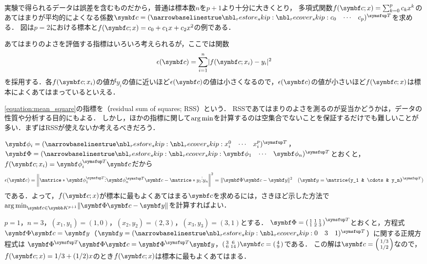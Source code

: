 \documentclass[../../main]{subfiles}
\begin{document}
実験で得られるデータは誤差を含むものだから，普通は標本数\(n\)を\(p+1\)より十分に大きくとり，
多項式関数\(f(\vect{c};x)=\sum_{k=0}^pc_kx^k\)のあてはまりが平均的によくなる係数\(\vect{c}=\trps{\rowvect{c_0 & \cdots & c_p}}\)を求める．
図は\(p=2\)における標本と\(f(\vect{c};x)=c_0+c_1x+c_2x^2\)の例である．

あてはまりのよさを評価する指標はいろいろ考えられるが，ここでは関数
\begin{equation}
  \label{equation:mean_square}
  \epsilon(\vect{c}) = \sum_{i=1}^n\abs{f(\vect{c};x_i)-y_i}^2
\end{equation}
を採用する．各\(f(\vect{c};x_i)\)の値が\(y_i\)の値に近いほど\(\epsilon(\vect{c})\)の値は小さくなるので，\(\epsilon(\vect{c})\)の値が小さいほど\(f(\vect{c};x)\)は標本によくあてはまっているといえる．

\begin{note}
  \cref{equation:mean_square}の指標を（residual sum of squares; RSS）という．
  RSSであてはまりのよさを測るのが妥当かどうかは，データの性質や分析する目的にもよる．
  しかし，ほかの指標に関して\(\operatorname*{arg\,min}\)を計算するのは\texttwoemdash 空集合でないことを保証するだけでも\texttwoemdash 難しいことが多い．まずはRSSが使えないか考えるべきだろう．
\end{note}

\(\vect{\phi}_i=\trps{\rowvect{x_i^0 & \cdots & x_i^p}}\)，\(\mat{\Phi}=\trps{\rowvect{\vect{\phi}_1 & \cdots & \vect{\phi}_n}}\)とおくと，\(f(\vect{c};x_i)=\trps{\vect{\phi}_i}\vect{c}\)だから
\[
  \epsilon(\vect{c}) = \vnorm*{\matrice*{\trps{\vect{\phi}_1} \\ \vdots \\ \trps{\vect{\phi}_n}}\vect{c}-\matrice*{y_1 \\ \vdots \\ y_n}}^2
  = \vnorm{\mat{\Phi}\vect{c}-\vect{y}}^2\quad(\vect{y}=\trps{\matrice{y_1 & \cdots & y_n}})
\]
である．よって，\(f(\vect{c};x)\)が標本に最もよくあてはまる\(\vect{c}\)を求めるには，さきほど示した方法で\(\argmin_{\vect{c}\in\numset{K}^{p+1}}\vnorm{\mat{\Phi}\vect{c}-\vect{y}}\)を計算すればよい．

\begin{example}
  \label{example:linear_regression}
  \(p=1\)，\(n=3\)，\((x_1,y_1)=(1,0)\)，\((x_2,y_2)=(2,3)\)，\((x_3,y_3)=(3,1)\)とする．
  \(\mat{\Phi}=\trps{\smallmatrice{1 & 1 & 1 \\ 1 & 2 & 3}}\)とおくと，方程式\(\mat{\Phi}\vect{c}=\vect{y}\)（\(\vect{y}=\trps{\rowvect{0 & 3 & 1}}\)）に関する正規方程式は
  \(\trps{\mat{\Phi}}\mat{\Phi}\vect{c}=\trps{\mat{\Phi}}\vect{y}\)，\(\smallmatrice{3 & 6 \\ 6 & 14}\vect{c}=\smallmatrice{4 \\ 9}\)である．
  この解は\(\vect{c}=\smallmatrice{1/3 \\ 1/2}\)なので，\(f(\vect{c};x)=1/3+(1/2)x\)のとき\(f(\vect{c};x)\)は標本に最もよくあてはまる．
\end{example}
\end{document}
